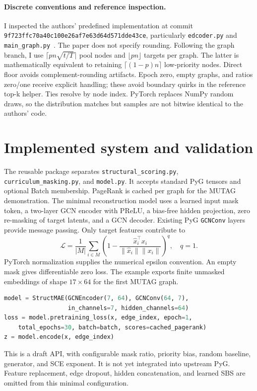 \documentclass{article}
\begin{document}
\paragraph{Discrete conventions and reference inspection.}
I inspected the authors' predefined implementation at commit \texttt{9f723ffc70a40c100e26af7e63d64d571dde43ce}, particularly \texttt{edcoder.py} and \texttt{main\_graph.py}~\cite{code}. The paper does not specify rounding. Following the graph branch, I use $\lceil pn\sqrt{t/T}\rceil$ pool nodes and $\lfloor pn\rfloor$ targets per graph. The latter is mathematically equivalent to retaining $\lceil(1-p)n\rceil$ low-priority nodes. Direct floor avoids complement-rounding artifacts. Epoch zero, empty graphs, and ratios zero/one receive explicit handling; these avoid boundary quirks in the reference top-k helper. Ties resolve by node index. PyTorch replaces NumPy random draws, so the distribution matches but samples are not bitwise identical to the authors' code.

\clearpage
\section{Implemented system and validation}
The reusable package separates \texttt{structural\_scoring.py}, \texttt{curriculum\_masking.py}, and \texttt{model.py}. It accepts standard PyG tensors and optional Batch membership. PageRank is cached per graph for the MUTAG demonstration. The minimal reconstruction model uses a learned input mask token, a two-layer GCN encoder with PReLU, a bias-free hidden projection, zero re-masking of target latents, and a GCN decoder. Existing PyG \texttt{GCNConv} layers provide message passing. Only target features contribute to
\begin{equation}
\mathcal L=\frac{1}{|M|}\sum_{i\in M}\left(1-
\frac{\hat x_i^\top x_i}{\|\hat x_i\|\|x_i\|}\right)^q,\quad q=1.
\end{equation}
PyTorch normalization supplies the numerical epsilon convention. An empty mask gives differentiable zero loss. The example exports finite unmasked embeddings of shape $17\times64$ for the first MUTAG graph.

\begin{lstlisting}[language=Python]
model = StructMAE(GCNEncoder(7, 64), GCNConv(64, 7),
                  in_channels=7, hidden_channels=64)
loss = model.pretraining_loss(x, edge_index, epoch=1,
    total_epochs=30, batch=batch, scores=cached_pagerank)
z = model.encode(x, edge_index)
\end{lstlisting}
This is a draft API, with configurable mask ratio, priority bias, random baseline, generator, and SCE exponent. It is not yet integrated into upstream PyG. Feature replacement, edge dropout, hidden concatenation, and learned SBS are omitted from this minimal configuration.
\end{document}
